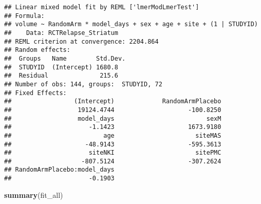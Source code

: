 \documentclass[]{article}
\newenvironment{Shaded}{\begin{snugshade}}{\end{snugshade}}
\newcommand{\KeywordTok}[1]{\textcolor[rgb]{0.13,0.29,0.53}{\textbf{#1}}}
\newcommand{\NormalTok}[1]{#1}
\theoremstyle{definition}
\theoremstyle{definition}
\theoremstyle{definition}
\theoremstyle{remark}
\begin{document}
\begin{verbatim}
## Linear mixed model fit by REML ['lmerModLmerTest']
## Formula: 
## volume ~ RandomArm * model_days + sex + age + site + (1 | STUDYID)
##    Data: RCTRelapse_Striatum
## REML criterion at convergence: 2204.864
## Random effects:
##  Groups   Name        Std.Dev.
##  STUDYID  (Intercept) 1680.8  
##  Residual              215.6  
## Number of obs: 144, groups:  STUDYID, 72
## Fixed Effects:
##                 (Intercept)             RandomArmPlacebo  
##                  19124.4744                    -100.8250  
##                  model_days                         sexM  
##                     -1.1423                    1673.9180  
##                         age                      siteMAS  
##                    -48.9143                    -595.3613  
##                     siteNKI                      sitePMC  
##                   -807.5124                    -307.2624  
## RandomArmPlacebo:model_days  
##                     -0.1903
\end{verbatim}

\begin{Shaded}
\begin{Highlighting}[]
  \KeywordTok{summary}\NormalTok{(fit_all)}
\end{Highlighting}
\end{Shaded}
\end{document}
